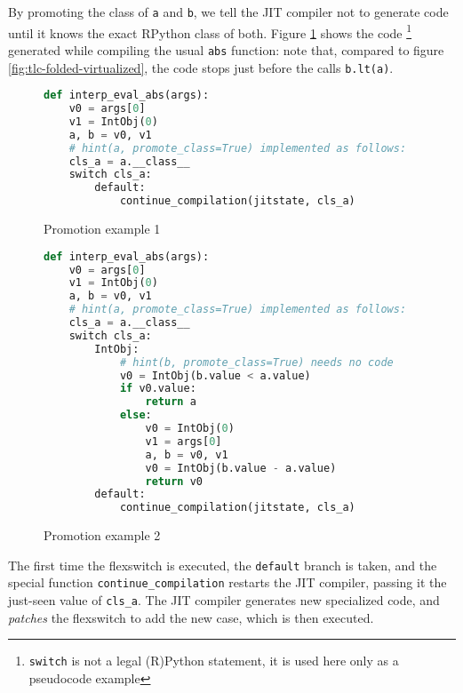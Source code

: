 By promoting the class of \lstinline{a} and \lstinline{b}, we tell the JIT
compiler not to generate code until it knows the exact RPython class of both.
Figure \ref{fig:tlc-abs-promotion-1} shows the
code \footnote{\lstinline{switch} is not a legal (R)Python statement, it is
  used here only as a pseudocode example} generated while compiling the usual
\lstinline{abs} function: note that, compared to figure
\ref{fig:tlc-folded-virtualized}, the code stops just before the calls
\lstinline{b.lt(a)}.

\begin{figure}[h]
\begin{center}
\begin{lstlisting}[language=Python]
def interp_eval_abs(args):
    v0 = args[0]
    v1 = IntObj(0)
    a, b = v0, v1
    # hint(a, promote_class=True) implemented as follows:
    cls_a = a.__class__
    switch cls_a:
        default: 
            continue_compilation(jitstate, cls_a)
\end{lstlisting}
\caption{Promotion example 1}
\label{fig:tlc-abs-promotion-1}
\end{center}
\end{figure}

\begin{figure}[h]
\begin{center}
\begin{lstlisting}[language=Python]
def interp_eval_abs(args):
    v0 = args[0]
    v1 = IntObj(0)
    a, b = v0, v1
    # hint(a, promote_class=True) implemented as follows:
    cls_a = a.__class__
    switch cls_a:
        IntObj:
            # hint(b, promote_class=True) needs no code
            v0 = IntObj(b.value < a.value)
            if v0.value:
                return a
            else:
                v0 = IntObj(0)
                v1 = args[0]
                a, b = v0, v1
                v0 = IntObj(b.value - a.value)
                return v0
        default: 
            continue_compilation(jitstate, cls_a)
\end{lstlisting}
\caption{Promotion example 2}
\label{fig:tlc-abs-promotion-2}
\end{center}
\end{figure}

The first time the flexswitch is executed, the \lstinline{default} branch is
taken, and the special function \lstinline{continue_compilation} restarts the
JIT compiler, passing it the just-seen value of \lstinline{cls_a}.  The JIT
compiler generates new specialized code, and \emph{patches} the flexswitch to
add the new case, which is then executed.


